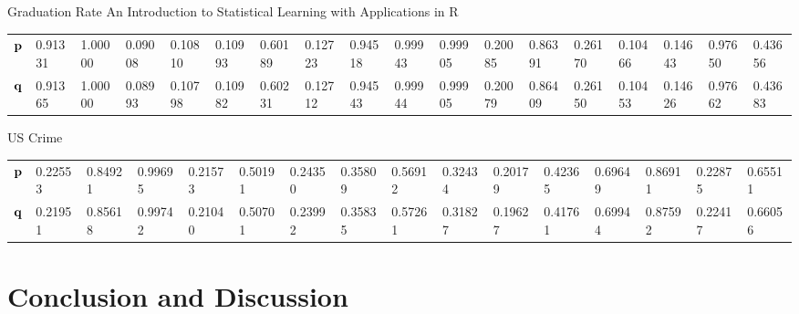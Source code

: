 \documentclass{amsart}[12pt]
\begin{document}
Graduation Rate
An Introduction to Statistical Learning with Applications in R

\begin{tabular}{llllllllllllllllll}
${\bf p}$ & 0.91331&1.00000&0.09008&0.10810&0.10993&0.60189&0.12723&0.94518&0.99943&0.99905&0.20085&0.86391&0.26170&0.10466&0.14643&0.97650&0.43656\\
${\bf q}$ & 0.91365&1.00000&0.08993&0.10798&0.10982&0.60231&0.12712&0.94543&0.99944&0.99905&0.20079&0.86409&0.26150&0.10453&0.14626&0.97662&0.43683\\
\end{tabular}

US Crime

\begin{tabular}{llllllllllllllll}
${\bf p}$ & 0.22553&0.84921&0.99695&0.21573&0.50191&0.24350&0.35809&0.56912&0.32434&0.20179&0.42365&0.69649&0.86911&0.22875&0.65511\\
${\bf q}$ & 0.21951&0.85618&0.99742&0.21040&0.50701&0.23992&0.35835&0.57261&0.31827&0.19627&0.41761&0.69944&0.87592&0.22417&0.66056\\
\end{tabular}

\section{Conclusion and Discussion}
\label{sec:conclusion}



\end{document}
